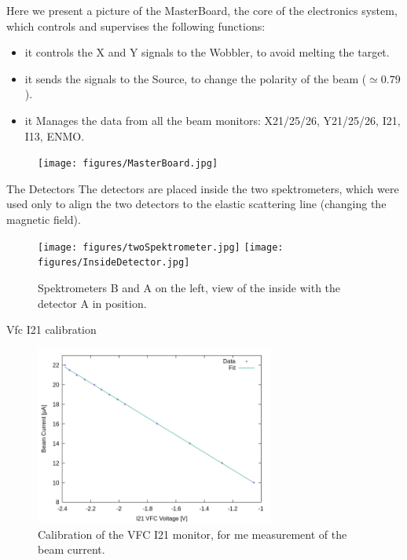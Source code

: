 \documentclass[8pt,a4paper]{beamer}
\begin{document}
\begin{frame}

Here we present a picture of the MasterBoard, the core of the electronics system, which controls and supervises the following functions:

\begin{itemize}
\item it controls the X and Y signals to the Wobbler, to avoid melting the target.
\item it sends the signals to the Source, to change the polarity of the beam ($\simeq 0.79$).
\item it Manages the data from all the beam monitors: X21/25/26, Y21/25/26, I21, I13, ENMO.

\end{itemize}


\begin{figure}
\centering
\texttt{[image: figures/MasterBoard.jpg]}
\end{figure}
 
\end{frame}


\begin{frame}{The Detectors}
The detectors are placed inside the two spektrometers, which were used only to align the two detectors to the elastic scattering line (changing the magnetic field).

\begin{figure}[hbtp]
\centering
\texttt{[image: figures/twoSpektrometer.jpg]}
\hspace{1cm}
\texttt{[image: figures/InsideDetector.jpg]} 
\caption{Spektrometers B and A on the left, view of the inside with the detector A in position.}
\end{figure}


\end{frame}

\begin{frame}{Vfc I21 calibration}
\begin{figure}[hbtp]
\centering
\includegraphics[width = 0.7\textwidth]{figures/Calib_I21_from_Pb_runs.png}
\caption{ Calibration of the VFC I21 monitor, for me measurement of the beam current.}
\end{figure}

\end{frame}
\end{document}
